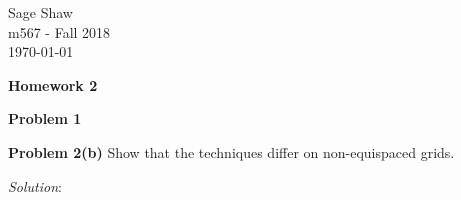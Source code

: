 \documentclass[12pt]{article}
\newcommand{\problem}[1]{\hspace{-4 ex} \large \textbf{Problem #1} }
\newcommand{\solution}{\textit{Solution}:\bigbreak}
\begin{document}
	\thispagestyle{empty}
	
	\begin{flushright}
		Sage Shaw \\
		m567 - Fall 2018 \\
		\today
	\end{flushright}
	
\begin{center}{\large \textbf{Homework 2}}\end{center}
\bigbreak

\hspace{-.5 ex}\problem{1} 

\problem{2(b)} Show that the techniques differ on non-equispaced grids. 

\solution

\bigbreak
\end{document}

